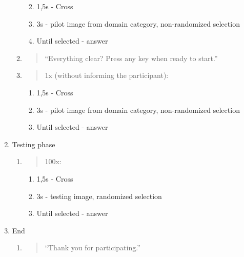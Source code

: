 \documentclass{llncs}
\begin{document}
\begin{enumerate}
\begin{enumerate}
    \begin{enumerate}
    \def\labelenumiii{\roman{enumiii})}
    \item
      1,5s - Cross
    \item
      3s - pilot image from domain category, non-randomized selection
    \item
      Until selected - answer
    \end{enumerate}
  \item
    \begin{quote}
    ``Everything clear? Press any key when ready to start.''
    \end{quote}
  \item
    \begin{quote}
    1x (without informing the participant):
    \end{quote}

    \begin{enumerate}
    \def\labelenumiii{\roman{enumiii})}
    \item
      1,5s - Cross
    \item
      3s - pilot image from domain category, non-randomized selection
    \item
      Until selected - answer
    \end{enumerate}
  \end{enumerate}
\item
  Testing phase

  \begin{enumerate}
  \def\labelenumii{\alph{enumii})}
  \item
    \begin{quote}
    100x:
    \end{quote}

    \begin{enumerate}
    \def\labelenumiii{\roman{enumiii})}
    \item
      1,5s - Cross
    \item
      3s - testing image, randomized selection
    \item
      Until selected - answer
    \end{enumerate}
  \end{enumerate}
\item
  End

  \begin{enumerate}
  \def\labelenumii{\alph{enumii})}
  \item
    \begin{quote}
    ``Thank you for participating.''
    \end{quote}
  \end{enumerate}
\end{enumerate}
\end{document}
